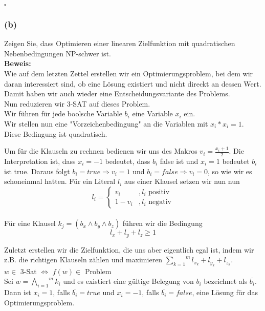 \documentclass[11pt,a4paper,ngerman]{article}
\begin{document}
\mbox{}\hfill$\square$

\subsubsection*{(b)}
Zeigen Sie, dass Optimieren einer linearen Zielfunktion mit quadratischen Nebenbedingungen NP-schwer ist.\\

\textbf{Beweis:}\\

Wie auf dem letzten Zettel erstellen wir ein Optimierungsproblem, bei dem wir daran interessiert sind,
ob eine Lösung existiert und nicht direckt an dessen Wert. Damit haben wir auch wieder eine Entscheidungsvariante des Problems.\\

Nun reduzieren wir 3-SAT auf dieses Problem.\\

Wir führen für jede boolsche Variable $b_i$ eine Variable $x_i$ ein.\\
Wir stellen nun eine "Vorzeichenbedingung" an die Variablen mit
$x_i * x_i = 1$. Diese Bedingung ist quadratisch.

Um für die Klauseln zu rechnen bedienen wir uns des Makros $v_i = \frac{x_i + 1}{2}$.
Die Interpretation ist, dass $x_i = -1$ bedeutet, dass $b_i$ false ist und $x_i = 1$ bedeutet $b_i$ ist true.
Daraus folgt $b_i = true \Rightarrow v_i = 1$ und $b_i = false \Rightarrow v_i = 0$, so wie wir es schoneinmal hatten.
Für ein Literal $l_i$ aus einer Klausel setzen wir nun nun 
$$l_i = \left\{ \begin{array}{lr} v_i \quad &, l_i \text{ positiv} \\ 1-v_i &, l_i \text{ negativ} \end{array}\right.$$ \\

Für eine Klausel $k_j = (b_x \land b_y \land b_z)$ führen wir die Bedingung\\
$$
    l_x + l_y + l_z \geq 1
$$

Zuletzt erstellen wir die Zielfunktion, die uns aber eigentlich egal ist, indem wir
z.B. die richtigen Klauseln zählen und maximieren $\overset{m}{\underset{k=1}{\sum}} l_{x_k} + l_{y_k} + l_{z_k}$.\\

$w \in $ 3-Sat $\Leftrightarrow$ $f(w) \in$ Problem\\
Sei $w = \overset{m}{\underset{i=1}{\bigwedge}} k_i$ und es existiert eine gültige Belegung von $b_i$ bezeichnet als $\overline{b_i}$.\\
Dann ist $x_i = 1$, falls $\overline{b_i} = true$ und $x_i = -1$, falls $\overline{b_i} = false$, eine Lösung für das Optimierungsproblem.\\
\end{document}
